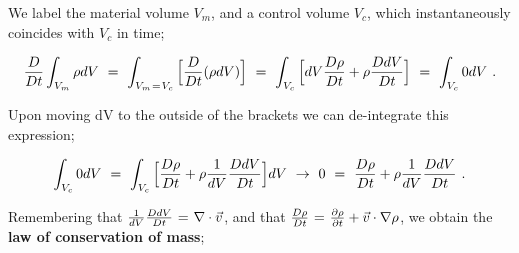 \documentclass{article}
\begin{document}
We label the material volume \begin{math} V_m \end{math}, and a control volume \begin{math} V_c \end{math}, which instantaneously coincides with \begin{math} V_c \end{math} in time;

\begin{equation} \label{eb-eq-1-124}
\frac{D}{D t} \int_{V_m} \rho dV \hspace{0.125cm} = \hspace{0.125cm} \int_{V_m \hspace{0.025cm} = \hspace{0.025cm} V_c} \Big[ \frac{D}{D t} ( \rho dV ) \Big] \hspace{0.125cm} = \hspace{0.125cm} \int_{V_c} \Big[ dV \frac{D \rho}{D t} + \rho \frac{D dV}{D t} \Big] \hspace{0.125cm} = \hspace{0.125cm}  \int_{V_c} 0 dV \hspace{0.125cm}  . 
\end{equation} 

Upon moving dV to the outside of the brackets we can de-integrate this expression;

\begin{equation} \label{eb-eq-1-125}
\int_{V_c} 0 dV \hspace{0.125cm} = \hspace{0.125cm} \int_{V_c} \Big[ \frac{D \rho}{D t} + \rho \frac{1}{dV} \frac{D dV}{D t} \Big] dV \hspace{0.125cm} \rightarrow \hspace{0.125cm} 0 \hspace{0.125cm} = \hspace{0.125cm} \frac{D \rho}{D t} + \rho \frac{1}{dV} \frac{D dV}{D t}  \hspace{0.125cm}  . 
\end{equation} 

Remembering that \begin{math} \frac{1}{dV} \frac{D dV}{D t} \hspace{0.025cm} = \hspace{0.025cm} \nabla \cdot \vec{v} \end{math}, and that \begin{math} \frac{D \rho}{D t} \hspace{0.025cm} = \hspace{0.025cm} \frac{\partial{\rho}}{\partial{t}} + \vec{v} \cdot \nabla{\rho} \end{math}, we obtain the \textbf{law of conservation of mass};
\end{document}
